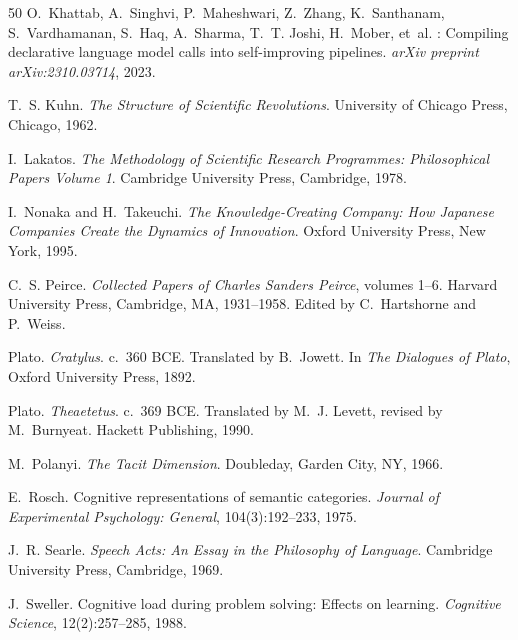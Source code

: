 \documentclass[12pt,a4paper]{article}
\begin{document}
\begin{thebibliography}{50}
O.~Khattab, A.~Singhvi, P.~Maheshwari, Z.~Zhang, K.~Santhanam, S.~Vardhamanan, S.~Haq, A.~Sharma, T.~T. Joshi, H.~Mober, et~al.
: Compiling declarative language model calls into self-improving pipelines.
\newblock \emph{arXiv preprint arXiv:2310.03714}, 2023.

T.~S. Kuhn.
\newblock \emph{The Structure of Scientific Revolutions}.
\newblock University of Chicago Press, Chicago, 1962.

I.~Lakatos.
\newblock \emph{The Methodology of Scientific Research Programmes: Philosophical Papers Volume 1}.
\newblock Cambridge University Press, Cambridge, 1978.

I.~Nonaka and H.~Takeuchi.
\newblock \emph{The Knowledge-Creating Company: How Japanese Companies Create the Dynamics of Innovation}.
\newblock Oxford University Press, New York, 1995.

C.~S. Peirce.
\newblock \emph{Collected Papers of Charles Sanders Peirce}, volumes 1--6.
\newblock Harvard University Press, Cambridge, MA, 1931--1958.
\newblock Edited by C.~Hartshorne and P.~Weiss.

Plato.
\newblock \emph{Cratylus}.
\newblock c.~360 BCE.
\newblock Translated by B.~Jowett. In \emph{The Dialogues of Plato}, Oxford University Press, 1892.

Plato.
\newblock \emph{Theaetetus}.
\newblock c.~369 BCE.
\newblock Translated by M.~J. Levett, revised by M.~Burnyeat. Hackett Publishing, 1990.

M.~Polanyi.
\newblock \emph{The Tacit Dimension}.
\newblock Doubleday, Garden City, NY, 1966.

E.~Rosch.
\newblock Cognitive representations of semantic categories.
\newblock \emph{Journal of Experimental Psychology: General}, 104(3):192--233, 1975.

J.~R. Searle.
\newblock \emph{Speech Acts: An Essay in the Philosophy of Language}.
\newblock Cambridge University Press, Cambridge, 1969.

J.~Sweller.
\newblock Cognitive load during problem solving: Effects on learning.
\newblock \emph{Cognitive Science}, 12(2):257--285, 1988.


\end{thebibliography}
\end{document}
